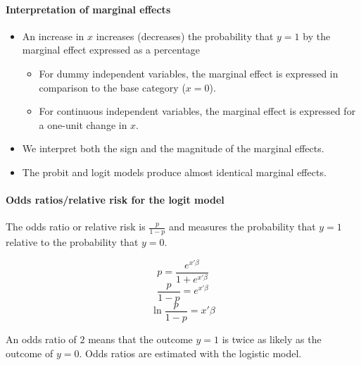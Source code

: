 \paragraph{Interpretation of marginal effects}
\begin{itemize}
    \item An increase in $x$ increases (decreases) the probability that $y=1$ by the marginal effect expressed as a percentage
    \begin{itemize}
        \item For dummy independent variables, the marginal effect is expressed in comparison to the base category ($x=0$).
        \item For continuous independent variables, the marginal effect is expressed for a one-unit change in $x$.
    \end{itemize}
    \item We interpret both the sign and the magnitude of the marginal effects.
    \item The probit and logit models produce almost identical marginal effects.
\end{itemize}

\paragraph{Odds ratios/relative risk for the logit model}
The odds ratio or relative risk is $\frac{p}{1-p}$ and measures the probability that $y=1$ relative to the probability that $y=0$.

$$p = \frac{e^{x'\beta}}{1+e^{x'\beta}}$$
$$\frac{p}{1-p} = e^{x'\beta}$$
$$\ln \frac{p}{1-p} = x'\beta$$

An odds ratio of $2$ means that the outcome $y=1$ is twice as likely as the outcome of $y=0$. Odds ratios are estimated with the logistic model.
